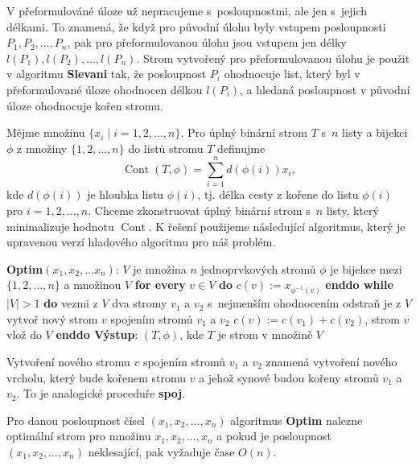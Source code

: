 \documentclass[a4paper,12pt]{article}
\DeclareMathOperator*{\Cont}{Cont}
\begin{document}
V přeformulováné úloze už nepracujeme s~posloupnostmi, ale jen s~jejich délkami. 
To znamená, že když pro původní úlohu 
byly vstupem posloupnosti $P_1,P_2,\dots,
P_n$, pak pro 
přeformulovanou úlohu jsou vstupem jen délky  
$l(P_1),l(P_2),\dots,l(P_n)$. Strom vytvořený pro 
přeformulovanou úlohu  
je použit v algoritmu {\bf Slevani}  
tak, že  posloupnost $P_i$ ohodnocuje list, který byl v 
přeformulované úloze ohodnocen délkou $l(P_i)$, a hledaná posloupnost 
v původní úloze ohodnocuje kořen stromu. 

Mějme množinu $\{x_i\mid i=1,2,\dots,n\}$.  Pro úplný binární 
strom $T$ s~$n$ listy a bijekci $\phi$ z množiny $\{1,2,\dots,
n\}$ do 
listů stromu $T$ definujme 
$$\Cont(T,\phi )=\sum_{i=1}^nd(\phi (i))x_i,$$
kde $d(\phi (i))$ je hloubka listu $\phi (i)$, tj.  délka cesty z 
kořene do listu $\phi (i)$  pro $i=1,2,\dots,n$.  
Chceme zkonstruovat úplný binární strom s~$n$ listy, 
který minimalizuje hodnotu $\Cont$. K řešení 
použijeme následující algoritmus, který je upravenou verzí 
hladového algoritmu pro náš problém.

{\bf Optim$(x_1,x_2,\dots x_n)$}:\newline 
$V$ je množina $n$ jednoprvkových stromů\newline 
$\phi$ je bijekce mezi $\{1,2,\dots,n\}$ a množinou $V$\newline 
{\bf \textsf{for every}} $v\in V$ {\bf do} $c(v):=x_{\phi^{-1}(v)}$ {\bf enddo\newline 
while} $|V|>1$ {\bf do\newline 
\phantom{{\rm---}}}vezmi z $V$ dva stromy $v_1$ a $v_2$ s~nejmenším ohodnocením\newline 
\phantom{---}odstraň je z $V$\newline 
\phantom{---}vytvoř nový strom $v$ spojením stromů $
v_1$ a $v_2$\newline 
\phantom{---}$c(v):=c(v_1)+c(v_2)$, strom $v$ vlož do $V$\newline 
{\bf enddo\newline 
Výstup}: $(T,\phi )$, kde $T$ je strom v množině $V$

Vytvoření nového stromu $v$ spojením stromů 
$v_1$ a $v_2$ znamená vytvoření nového vrcholu, který bude 
kořenem stromu $v$ a jehož synové budou kořeny stromů 
$v_1$ a $v_2$. To je analogické proceduře {\bf spoj}.

\begin{veta}Pro danou posloupnost čísel 
$(x_1,x_2,\dots,x_n)$ algoritmus {\bf Optim} nalezne optimální strom 
pro množinu $x_1,x_2,\dots,x_n$ a pokud je posloupnost 
$(x_1,x_2,\dots,x_n)$ neklesající, pak vyža\-du\-je čase 
$O(n)$.  
\end{veta}
\end{document}
